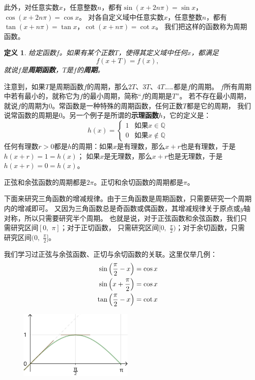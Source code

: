 \documentclass[12pt,UTF8]{ctexbook}
\newtheorem{df}{定义}[section]
\begin{document}
此外，对任意实数$x$，任意整数$n$，都有$\sin(x+2n\pi) = \sin{x}$，$\cos(x+2n\pi) = \cos{x}$。
对各自定义域中任意实数$x$，任意整数$n$，都有$\tan(x+n\pi) = \tan{x}$，$\cot(x+n\pi) = \cot{x}$。
我们把这样的函数称为周期函数。
\begin{df}
    给定函数$f$。如果有某个正数$T$，使得其定义域中任何$x$，都满足
    $$ f(x + T) = f(x),$$
    就说$f$是\textbf{周期函数}，$T$是$f$的\textbf{周期}。
\end{df}
注意到，如果$T$是周期函数$f$的周期，那么$2T$、$3T$、$4T$……都是$f$的周期。
$f$所有周期中若有最小的，就称它为$f$的最小周期，简称“$f$的周期是$T$”。
若不存在最小周期，就说$f$的周期为$0$。常函数是一种特殊的周期函数，任何正数$T$都是它的周期，
我们说常函数的周期是$0$。另一个例子是所谓的\textbf{示理函数}$h$，它的定义是：
$$
h(x) = \left\{
        \begin{array}{cc}
        1 & \mbox{如果}x\in\mathbb{Q} \\
        0 & \mbox{如果}x\notin\mathbb{Q} 
        \end{array}
    \right.
$$
任何有理数$r>0$都是$h$的周期：如果$x$是有理数，那么$x+r$也是有理数，于是$h(x+r) = 1 = h(x)$；
如果$x$是无理数，那么$x+r$也是无理数，于是$h(x+r) = 0 = h(x)$。

正弦和余弦函数的周期都是$2\pi$。正切和余切函数的周期都是$\pi$。

下面来研究三角函数的增减规律。由于三角函数是周期函数，只需要研究一个周期内的增减即可。
又因为三角函数总是奇函数或偶函数，其增减规律关于原点或$y$轴对称，所以只需要研究半个周期。
也就是说，对于正弦函数和余弦函数，我们只需研究区间$[0, \,\,\pi]$；对于正切函数，
只需研究区间$[0, \,\,\frac{\pi}{2})$；对于余切函数，只需研究区间$(0, \,\,\frac{\pi}{2}]$。

我们学习过正弦与余弦函数、正切与余切函数的关联。这里仅举几例：
\begin{align}
    \sin{\left(\frac{\pi}{2} - x\right)} &= \cos{x} \notag \\
    \sin{\left(x + \frac{\pi}{2}\right)} &= \cos{x} \notag \\
    \tan{\left(\frac{\pi}{2} - x\right)} &= \cot{x} \notag     
\end{align}

\begin{figure} %
    \vspace{-35pt}
    \flushright
    \includegraphics[width=0.5\textwidth]{三角函数2.png}
\end{figure}
\end{document}
